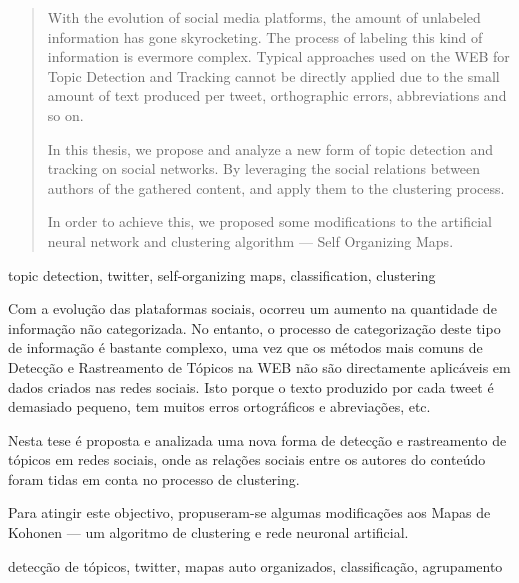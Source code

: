 
\begin{abstract}
With the evolution of social media platforms, the amount of unlabeled information has gone skyrocketing. The process of labeling this kind of information is evermore complex. Typical approaches used on the WEB for Topic Detection and Tracking cannot be directly applied due to the small amount of text produced per tweet, orthographic errors, abbreviations and so on.

In this thesis, we propose and analyze a new form of topic detection and tracking on social networks. By leveraging the social relations between authors of the gathered content, and apply them to the clustering process.

In order to achieve this, we proposed some modifications to the artificial neural network  and clustering algorithm --- Self Organizing Maps. 
\end{abstract}

\begin{keywords}
topic detection, twitter, self-organizing maps, classification, clustering
\end{keywords}
\clearpage
\thispagestyle{empty}
\cleardoublepage

\begin{resumo}
 Com a evolução das plataformas sociais, ocorreu um aumento na quantidade de informação não categorizada. No entanto, o processo de categorização deste tipo de informação é bastante complexo, uma vez que os métodos mais comuns de Detecção e Rastreamento de Tópicos na WEB não são directamente aplicáveis em dados criados nas redes sociais. Isto porque o texto produzido por cada tweet é demasiado pequeno, tem muitos erros ortográficos e abreviações, etc.

Nesta tese é proposta e analizada uma nova forma de detecção e rastreamento de tópicos em redes sociais, onde as relações sociais entre os autores do conteúdo foram tidas em conta no processo de clustering.

Para atingir este objectivo, propuseram-se algumas modificações aos Mapas de Kohonen --- um algoritmo de clustering e rede neuronal artificial.
\end{resumo}

\begin{palavraschave}
  detecção de tópicos, twitter, mapas auto organizados, classificação, agrupamento
\end{palavraschave}

\clearpage
\thispagestyle{empty}
\cleardoublepage

\dominitoc
\dominilof
\dominilot
 

